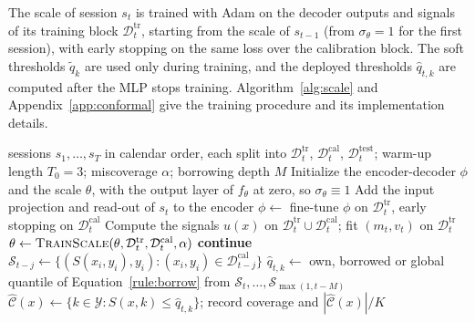 \documentclass{article}
\begin{document}
The scale of session $s_t$ is trained with Adam on the decoder outputs and signals of its training block $\mathcal{D}^{\mathrm{tr}}_t$, starting from the scale of $s_{t-1}$ (from $\sigma_\theta=1$ for the first session), with early stopping on the same loss over the calibration block. The soft thresholds $\tilde q_k$ are used only during training, and the deployed thresholds $\hat q_{t,k}$ are computed after the MLP stops training. Algorithm~\ref{alg:scale} and Appendix~\ref{app:conformal} give the training procedure and its implementation details.

\begin{algorithm}[!ht]
  \caption{Session-by-session chain with the learned class-conditional split-conformal layer, for one maze.}
  \label{alg:chain}
  \begin{algorithmic}[1]
    \Require sessions $s_1,\ldots,s_T$ in calendar order, each split into $\mathcal{D}^{\mathrm{tr}}_t$, $\mathcal{D}^{\mathrm{cal}}_t$, $\mathcal{D}^{\mathrm{test}}_t$; warm-up length $T_0=3$; miscoverage $\alpha$; borrowing depth $M$
    \State Initialize the encoder-decoder $\phi$ and the scale $\theta$, with the output layer of $f_\theta$ at zero, so $\sigma_\theta\equiv1$
      \State Add the input projection and read-out of $s_t$ to the encoder
      \State $\phi\gets$ fine-tune $\phi$ on $\mathcal{D}^{\mathrm{tr}}_t$, early stopping on $\mathcal{D}^{\mathrm{cal}}_t$ 
      \State Compute the signals $u(x)$ on $\mathcal{D}^{\mathrm{tr}}_t\cup\mathcal{D}^{\mathrm{cal}}_t$; fit $(m_t,v_t)$ on $\mathcal{D}^{\mathrm{tr}}_t$
      \State $\theta\gets\textsc{TrainScale}(\theta,\mathcal{D}^{\mathrm{tr}}_t,\mathcal{D}^{\mathrm{cal}}_t,\alpha)$ 
       \textbf{continue} 
      \EndIf
       
        \State $\mathcal{S}_{t-j}\gets\{(S(x_i,y_i),y_i):(x_i,y_i)\in\mathcal{D}^{\mathrm{cal}}_{t-j}\}$
      \EndFor
        \State $\hat q_{t,k}\gets$ own, borrowed or global quantile of Equation~\eqref{rule:borrow} from $\mathcal{S}_t,\ldots,\mathcal{S}_{\max(1,t-M)}$
      \EndFor
        \State $\widehat{\mathcal{C}}(x)\gets\{k\in\mathcal{Y}:S(x,k)\le\hat q_{t,k}\}$; record coverage and $|\widehat{\mathcal{C}}(x)|/K$
      \EndFor
    \EndFor
  \end{algorithmic}
\end{algorithm}
\end{document}
